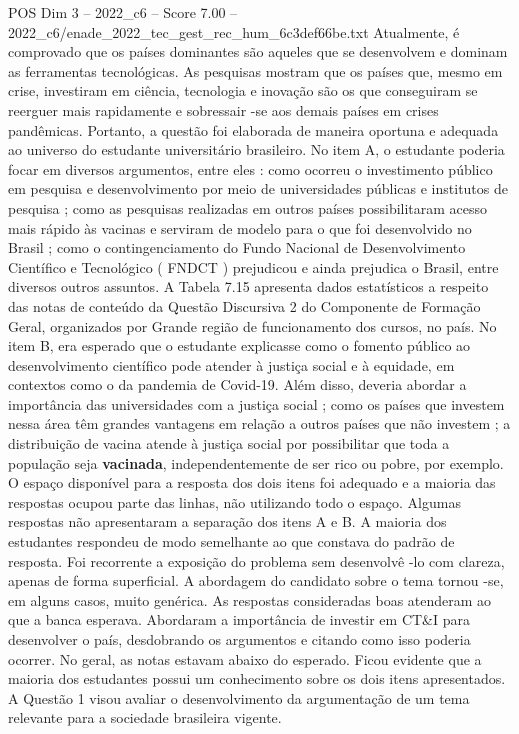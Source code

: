 \begin{textsample}{POS Dim 3 – 2022\_c6 – Score 7.00 – 2022\_c6/enade\_2022\_tec\_gest\_rec\_hum\_6c3def66be.txt}
Atualmente, é comprovado que os países dominantes são aqueles que se desenvolvem e dominam as ferramentas tecnológicas.
As pesquisas mostram que os países que, mesmo em crise, investiram em ciência, tecnologia e inovação são os que conseguiram se reerguer mais rapidamente e sobressair -se aos demais países em crises pandêmicas.
Portanto, a questão foi elaborada de maneira oportuna e adequada ao universo do estudante universitário brasileiro.
No item A, o estudante poderia focar em diversos argumentos, entre eles : como ocorreu o investimento público em pesquisa e desenvolvimento por meio de universidades públicas e institutos de pesquisa ; como as pesquisas realizadas em outros países possibilitaram acesso mais rápido às vacinas e serviram de modelo para o que foi desenvolvido no Brasil ; como o contingenciamento do Fundo Nacional de Desenvolvimento Científico e Tecnológico ( FNDCT ) prejudicou e ainda prejudica o Brasil, entre diversos outros assuntos.
A Tabela 7.15 apresenta dados estatísticos a respeito das notas de conteúdo da Questão Discursiva 2 do Componente de Formação Geral, organizados por Grande região de funcionamento dos cursos, no país.
No item B, era esperado que o estudante explicasse como o fomento público ao desenvolvimento científico pode atender à justiça social e à equidade, em contextos como o da pandemia de Covid-19.
Além disso, deveria abordar a importância das universidades com a justiça social ; como os países que investem nessa área têm grandes vantagens em relação a outros países que não investem ; a distribuição de vacina atende à justiça social por possibilitar que toda a população seja \textbf{vacinada}, independentemente de ser rico ou pobre, por exemplo.
O espaço disponível para a resposta dos dois itens foi adequado e a maioria das respostas ocupou parte das linhas, não utilizando todo o espaço.
Algumas respostas não apresentaram a separação dos itens A e B.
A maioria dos estudantes respondeu de modo semelhante ao que constava do padrão de resposta.
Foi recorrente a exposição do problema sem desenvolvê -lo com clareza, apenas de forma superficial.
A abordagem do candidato sobre o tema tornou -se, em alguns casos, muito genérica.
As respostas consideradas boas atenderam ao que a banca esperava.
Abordaram a importância de investir em CT\&I para desenvolver o país, desdobrando os argumentos e citando como isso poderia ocorrer.
No geral, as notas estavam abaixo do esperado.
Ficou evidente que a maioria dos estudantes possui um conhecimento sobre os dois itens apresentados.
A Questão 1 visou avaliar o desenvolvimento da argumentação de um tema relevante para a sociedade brasileira vigente.

\end{textsample}
